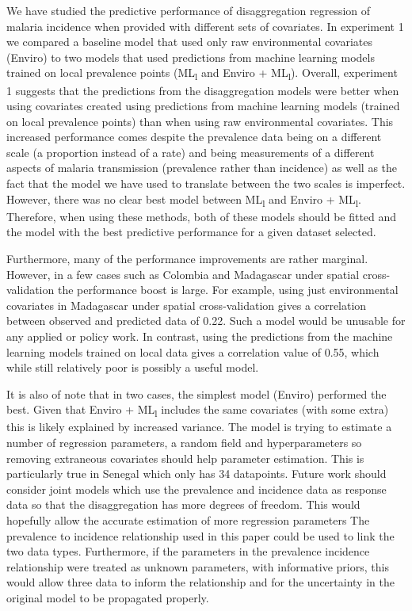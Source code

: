 \documentclass[review]{elsarticle}
\begin{document}
We have studied the predictive performance of disaggregation regression of malaria incidence when provided with different sets of covariates.
In experiment 1 we compared a baseline model that used only raw environmental covariates (Enviro) to two models that used predictions from machine learning models trained on local prevalence points (ML\textsubscript{l} and Enviro + ML\textsubscript{l}).
Overall, experiment 1 suggests that the predictions from the disaggregation models were better when using covariates created using predictions from machine learning models (trained on local prevalence points) than when using raw environmental covariates.
This increased performance comes despite the prevalence data being on a different scale (a proportion instead of a rate) and being measurements of a different aspects of malaria transmission (prevalence rather than incidence) as well as the fact that the model we have used to translate between the two scales is imperfect.
However, there was no clear best model between ML\textsubscript{l} and Enviro + ML\textsubscript{l}.
Therefore, when using these methods, both of these models should be fitted and the model with the best predictive performance for a given dataset selected.

Furthermore, many of the performance improvements are rather marginal. 
However, in a few cases such as Colombia and Madagascar under spatial cross-validation the performance boost is large.
For example, using just environmental covariates in Madagascar under spatial cross-validation gives a correlation between observed and predicted data of 0.22.
Such a model would be unusable for any applied or policy work.
In contrast, using the predictions from the machine learning models trained on local data gives a correlation value of 0.55, which while still relatively poor is possibly a useful model.

It is also of note that in two cases, the simplest model (Enviro) performed the best.
Given that Enviro + ML\textsubscript{l} includes the same covariates (with some extra) this is likely explained by increased variance.
The model is trying to estimate a number of regression parameters, a random field and hyperparameters so removing extraneous covariates should help parameter estimation.
This is particularly true in Senegal which only has 34 datapoints.
Future work should consider joint models which use the prevalence and incidence data as response data so that the disaggregation has more degrees of freedom.
This would hopefully allow the accurate estimation of more regression parameters
The prevalence to incidence relationship used in this paper could be used to link the two data types.
Furthermore, if the parameters in the prevalence incidence relationship were treated as unknown parameters, with informative priors, this would allow three data to inform the relationship and for the uncertainty in the original model to be propagated properly.
\end{document}

